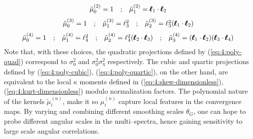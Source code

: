 \begin{equation}
\label{eq:4:poly-quad}
\begin{matrix}
\tilde{\mu}^{(2)}_0 = 1 & ; & \tilde{\mu}^{(2)}_1 = \pmb{\ell}_1\cdot\pmb{\ell}_2 
\end{matrix}
\end{equation} 
%
\begin{equation}
\label{eq:4:poly-cubic}
\begin{matrix}
\tilde{\mu}^{(3)}_0 = 1 & ; & \tilde{\mu}^{(3)}_1 = \ell_3^2 & ; & \tilde{\mu}^{(3)}_2 = \ell_3^2 (\pmb{\ell}_1\cdot\pmb{\ell}_2)
\end{matrix}
\end{equation} 
%
\begin{equation}
\label{eq:4:poly-quartic}
\begin{matrix}
\tilde{\mu}^{(4)}_0 = 1 & ; & \tilde{\mu}^{(4)}_1 = \ell_4^2 & ; & \tilde{\mu}^{(4)}_2 = \ell_4^2 (\pmb{\ell}_2\cdot\pmb{\ell}_3) & ; & \tilde{\mu}^{(4)}_3 = (\pmb{\ell}_1\cdot\pmb{\ell}_2)(\pmb{\ell}_3\cdot\pmb{\ell}_4) 
\end{matrix}
\end{equation}
%
Note that, with these choices, the quadratic projections defined by (\ref{eq:4:poly-quad}) correspond to $\sigma_0^2$ and $\sigma_0^2\sigma_\eta^2$ respectively. The cubic and quartic projections defined by (\ref{eq:4:poly-cubic}), (\ref{eq:4:poly-quartic}), on the other hand, are equivalent to the local $\kappa$ moments defined in (\ref{eq:4:skew-dimensionless}), (\ref{eq:4:kurt-dimensionless}) modulo normalization factors. The polynomial nature of the kernels $\tilde{\mu}^{(n)}_i$, make it so $\mu^{(n)}_i$ capture local features in the convergence maps. By varying and combining different smoothing scales $\theta_G$, one can hope to probe different angular scales in the multi--spectra, hence gaining sensitivity to large scale angular correlations.     

